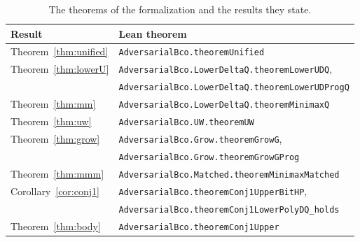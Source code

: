 \documentclass[11pt]{amsart}
\theoremstyle{definition}
\numberwithin{equation}{section}
\begin{document}
\begin{table}[ht]
\centering
\small
\begin{tabular}{ll}
\hline
Result & Lean theorem\\
\hline
Theorem~\ref{thm:unified} & \texttt{AdversarialBco.theoremUnified}\\
Theorem~\ref{thm:lowerU} & \texttt{AdversarialBco.LowerDeltaQ.theoremLowerUDQ},\\
 & \texttt{AdversarialBco.LowerDeltaQ.theoremLowerUDProgQ}\\
Theorem~\ref{thm:mm} & \texttt{AdversarialBco.LowerDeltaQ.theoremMinimaxQ}\\
Theorem~\ref{thm:uw} & \texttt{AdversarialBco.UW.theoremUW}\\
Theorem~\ref{thm:grow} & \texttt{AdversarialBco.Grow.theoremGrowG},\\
 & \texttt{AdversarialBco.Grow.theoremGrowGProg}\\
Theorem~\ref{thm:mmm} & \texttt{AdversarialBco.Matched.theoremMinimaxMatched}\\
Corollary~\ref{cor:conj1} & \texttt{AdversarialBco.theoremConj1UpperBitHP},\\
 & \texttt{AdversarialBco.theoremConj1LowerPolyDQ\_holds}\\
Theorem~\ref{thm:body} & \texttt{AdversarialBco.theoremConj1Upper}\\
\hline
\end{tabular}
\caption{The theorems of the formalization and the results they state.}\label{tab:formal}
\end{table}
\end{document}
